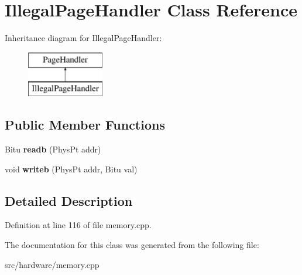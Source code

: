 \hypertarget{classIllegalPageHandler}{\section{Illegal\-Page\-Handler Class Reference}
\label{classIllegalPageHandler}
}
Inheritance diagram for Illegal\-Page\-Handler\-:\begin{figure}[H]
\begin{center}
\leavevmode
\includegraphics[height=2.000000cm]{classIllegalPageHandler}
\end{center}
\end{figure}
\subsection*{Public Member Functions}
\begin{DoxyCompactItemize}
\item 
\hypertarget{classIllegalPageHandler_a76f1d0cf8cacaa7a54d9cd87dcd77aa3}{Bitu {\bfseries readb} (Phys\-Pt addr)}\label{classIllegalPageHandler_a76f1d0cf8cacaa7a54d9cd87dcd77aa3}

\item 
\hypertarget{classIllegalPageHandler_a061eb7abdb84d8bc85d8c83fecbe371e}{void {\bfseries writeb} (Phys\-Pt addr, Bitu val)}\label{classIllegalPageHandler_a061eb7abdb84d8bc85d8c83fecbe371e}

\end{DoxyCompactItemize}


\subsection{Detailed Description}


Definition at line 116 of file memory.\-cpp.



The documentation for this class was generated from the following file\-:\begin{DoxyCompactItemize}
\item 
src/hardware/memory.\-cpp\end{DoxyCompactItemize}
